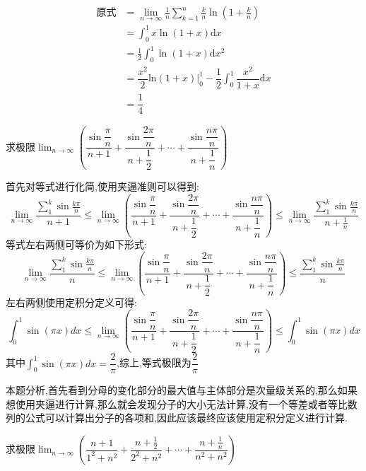 \documentclass[8pt a4paper, oneside, UTF8]{ctexbook}
\begin{document}
\begin{sloppypar}
\begin{solution}
\begin{align*}
          \text{原式} & =\lim_{n\to\infty}\frac1n\sum_{k=1}^n\frac kn\ln\left(1+\frac kn\right)\\
          & = \int_0^1x\ln(1+x)\mathrm{d}x\\
          & = \frac12\int_0^1\ln\left(1+x\right)\mathrm{d}x^2\\
          & =\dfrac{x^2}2\mathrm{ln}(1+x)\Bigg|_0^1-\dfrac12\int_0^1\dfrac{x^2}{1+x}\mathrm{d}x  \\
          & = \dfrac{1}{4}
        \end{align*}
    \end{solution}
    \begin{problem}
        求极限$\lim_{n\to\infty}\left(\dfrac{\sin\dfrac\pi n}{n+1}+\dfrac{\sin\dfrac{2\pi}n}{n+\dfrac12}+\cdots+\dfrac{\sin\dfrac{n\pi}n}{n+\dfrac1n}\right)$
    \end{problem}
    \begin{solution}
        首先对等式进行化简,使用夹逼准则可以得到:
        $$
        \lim_{n \to \infty}\dfrac{\sum_{1}^{k}\sin \frac{k \pi}{n}}{n+1} \leqslant \lim_{n\to\infty}\left(\dfrac{\sin\dfrac\pi n}{n+1}+\dfrac{\sin\dfrac{2\pi}n}{n+\dfrac12}+\cdots+\dfrac{\sin\dfrac{n\pi}n}{n+\dfrac1n}\right) \leqslant \lim_{n\to \infty}\dfrac{\sum_{1}^{k} \sin\frac{k \pi}{n}}{n+\frac1n}
        $$
        等式左右两侧可等价为如下形式:
        $$
        \lim_{n \to \infty}\dfrac{\sum_{1}^{k}\sin \frac{k \pi}{n}}{n} \leqslant \lim_{n\to\infty}\left(\dfrac{\sin\dfrac\pi n}{n+1}+\dfrac{\sin\dfrac{2\pi}n}{n+\dfrac12}+\cdots+\dfrac{\sin\dfrac{n\pi}n}{n+\dfrac1n}\right) \leqslant \dfrac{\sum_{1}^{k}\sin \frac{k \pi}{n}}{n}
        $$
        左右两侧使用定积分定义可得:
        $$
            \int_0 ^1 \sin (\pi x) dx \leqslant \lim_{n\to\infty}\left(\dfrac{\sin\dfrac\pi n}{n+1}+\dfrac{\sin\dfrac{2\pi}n}{n+\dfrac12}+\cdots+\dfrac{\sin\dfrac{n\pi}n}{n+\dfrac1n}\right) \leqslant \int_0 ^1 \sin (\pi x) dx
        $$
        其中$\int_0 ^1 \sin (\pi x) dx=\dfrac{2}{\pi}$,综上,等式极限为$\dfrac{2}{\pi}$
    \end{solution}
    \begin{note}
        本题分析,首先看到分母的变化部分的最大值与主体部分是次量级关系的,那么如果想使用夹逼进行计算,那么就会发现分子的大小无法计算,没有一个等差或者等比数列的公式可以计算出分子的各项和,因此应该最终应该使用定积分定义进行计算.
    \end{note}
    \begin{problem}
        求极限$\lim_{n\to\infty}\left(\dfrac{n+1}{1^{2}+n^{2}}+\dfrac{n+\frac{1}{2}}{2^{2}+n^{2}}+\cdots+\dfrac{n+\frac{1}{n}}{n^{2}+n^{2}}\right)$

\end{problem}
\end{sloppypar}
\end{document}
